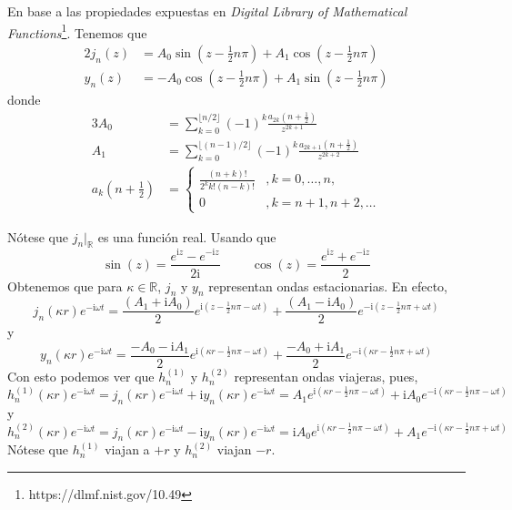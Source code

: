 \documentclass[11pt]{article}
\numberwithin{equation}{section}
\def\R{\mathbb{R}}
\let\i\relax
\def\i{\mathrm{i}}
\begin{document}
En base a las propiedades expuestas en \textit{Digital Library of Mathematical
Functions}\footnote{https://dlmf.nist.gov/10.49}. Tenemos que
\begin{alignat*}{2}
	j_n(z)
	&=
	A_0 \sin(z - \frac{1}{2} n \pi) 
	+
	A_1 \cos(z - \frac{1}{2} n \pi)
	\\
	y_n(z)
	&=
	- A_0 \cos(z - \frac{1}{2} n \pi)
	+ A_1 \sin(z - \frac{1}{2} n \pi)
\end{alignat*}
donde 
\begin{alignat*}{3}
	A_0 &= 
	\sum_{k=0}^{\lfloor n/2 \rfloor} 
		(-1)^k \frac{a_{2k} (n + \frac{1}{2}) }{z^{2k + 1}}  
	\\
	A_1 &=
	\sum_{k=0}^{\lfloor (n-1)/2 \rfloor}
		(-1)^k \frac{a_{2k+1}(n + \frac{1}{2}) }{z^{2k+2}} 
	\\
	a_k (n + \frac{1}{2})
	&=
	\begin{cases}
		\frac{(n+k)!}{2^k k! (n-k)!} &, k=0,\dots, n, \\
		0 &, k=n+1, n+2, \dots
	\end{cases}
\end{alignat*}

Nótese que \(j_n \vert_{\R}\) es una función real. Usando que 
\begin{displaymath}
	\sin(z) = \frac{e^{\i z} - e^{-\i z}}{2 \i}
	\hspace{1cm}
	\cos(z) = \frac{e^{\i z} + e^{-\i z}}{2} 
\end{displaymath}
Obtenemos que para \(\kappa\in \R\), \(j_n\) y \(y_n\) representan ondas
estacionarias. En efecto,
\begin{displaymath}
	j_n(\kappa r) e^{-\i \omega t}
	=
	\frac{(A_1 + \i A_0)}{2} e^{\i (z - \frac{1}{2} n \pi - \omega t)}
	+
	\frac{(A_1 - \i A_0)}{2} e^{-\i (z - \frac{1}{2} n \pi + \omega t)}
\end{displaymath}
y
\begin{displaymath}
	y_n(\kappa r) e^{-\i \omega t}
	=
	\frac{-A_0 - \i A_1}{2} e^{\i (\kappa r - \frac{1}{2} n \pi - \omega t)}
	+
	\frac{-A_0 + \i A_1}{2} e^{-\i (\kappa r - \frac{1}{2} n \pi + \omega t)} 
\end{displaymath}
Con esto podemos ver que \(h^{(1)}_n\) y \(h^{(2)}_n\) representan ondas
viajeras, pues,
\begin{displaymath}
	h^{(1)}_n(\kappa r) e^{-\i \omega t}
	=
	j_n(\kappa r) e^{-\i \omega t}
	+
	\i y_n(\kappa r) e^{-\i \omega t}
	=
	A_1 e^{\i (\kappa r - \frac{1}{2} n \pi - \omega t)}
	+
	\i A_0 e^{-\i (\kappa r - \frac{1}{2} n \pi - \omega t)}
\end{displaymath}
y
\begin{displaymath}
	h^{(2)}_n(\kappa r) e^{-\i \omega t}
	=
	j_n(\kappa r) e^{-\i \omega t}
	-
	\i y_n(\kappa r) e^{-\i \omega t}
	=
	\i A_0 e^{\i (\kappa r - \frac{1}{2} n \pi - \omega t)}
	+
	A_1 e^{-\i (\kappa r - \frac{1}{2} n \pi + \omega t)}
\end{displaymath}
Nótese que \(h^{(1)}_n\) viajan a \(+r\) y \(h^{(2)}_n\) viajan \(-r\).
\end{document}

